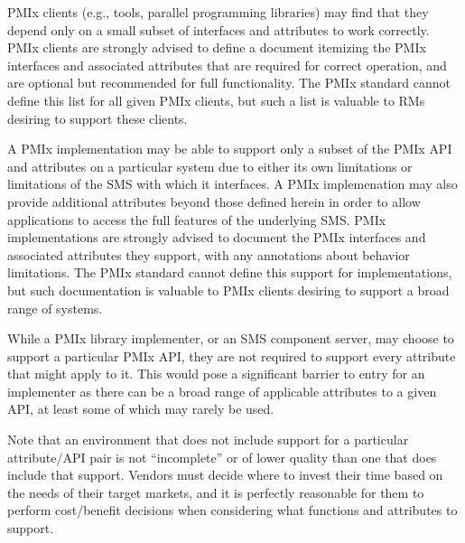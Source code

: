 \ac{PMIx} clients (e.g., tools, parallel programming libraries) may find that they depend only on a small subset of interfaces and attributes to work correctly.
\ac{PMIx} clients are strongly advised to define a document itemizing the \ac{PMIx} interfaces and associated attributes that are required for correct operation, and are optional but recommended for full functionality.
The \ac{PMIx} standard cannot define this list for all given \ac{PMIx} clients, but such a list is valuable to \acp{RM} desiring to support these clients.

A \ac{PMIx} implementation may be able to support only a subset of the \ac{PMIx} \acs{API} and attributes on
a particular system due to either its own limitations or limitations of the \ac{SMS} with which it interfaces.
A \ac{PMIx} implemenation may also provide additional attributes beyond those defined herein in order to allow
applications to access the full features of the underlying \ac{SMS}.
\ac{PMIx} implementations are strongly advised to document the \ac{PMIx} interfaces and associated attributes they support, with any annotations about behavior limitations.
The \ac{PMIx} standard cannot define this support for implementations, but such documentation is valuable to \ac{PMIx} clients desiring to support a broad range of systems.

While a \ac{PMIx} library implementer, or an \ac{SMS} component server, may choose to support a particular \ac{PMIx} \ac{API}, they are not required to support every attribute that might apply to it. This would pose a significant barrier to entry for an implementer as there can be a broad range of applicable attributes to a given \ac{API}, at least some of which may rarely be used.

Note that an environment that does not include support for a particular attribute/\ac{API} pair is not ``incomplete'' or of lower quality than one that does include that support. Vendors must decide where to invest their time based on the needs of their target markets, and it is perfectly reasonable for them to perform cost/benefit decisions when considering what functions and attributes to support.
